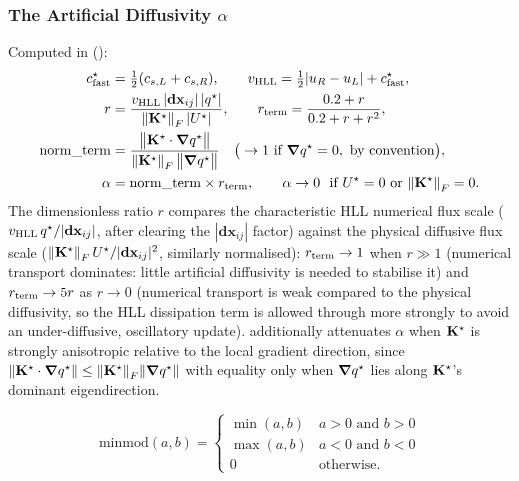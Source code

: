 \subsubsection{The Artificial Diffusivity $\alpha$}
Computed in 
():
\begin{align}
  c_{\rm fast}^\star &= \tfrac12(c_{s,L}+c_{s,R}) , \qquad
  v_{\rm HLL} = \tfrac12|u_R-u_L| + c_{\rm fast}^\star , \\
  r &= \frac{v_{\rm HLL}\, |\mathbf{dx}_{ij}|\, |q^\star|}{\norm{\mathbf{K}^{\star}}_F \, |U^\star|} ,
  \qquad
  r_{\rm term} = \frac{0.2+r}{0.2+r+r^2} , \\
  \mathrm{norm\_term} &=
    \frac{\big\| \mathbf{K}^{\star} \cdot \grad q^\star \big\|}{\norm{\mathbf{K}^{\star}}_F\,\big\|\grad q^\star\big\|}
    \quad\big(\to 1 \text{ if } \grad q^\star = 0,\ \text{by convention}\big), \\
  \alpha &= \mathrm{norm\_term}\times r_{\rm term} ,
  \qquad \alpha \to 0 \ \text{ if } U^\star = 0 \text{ or } \norm{\mathbf{K}^{\star}}_F = 0 .
  \label{eq:alpha_def}
\end{align}
The dimensionless ratio $r$ compares the characteristic HLL numerical
flux scale ($v_{\rm HLL}\,q^\star/|\mathbf{dx}_{ij}|$, after
clearing the $|\mathbf{dx}_{ij}|$ factor) against the physical diffusive
flux scale ($\norm{\mathbf{K}^{\star}}_F\,U^\star/|\mathbf{dx}_{ij}|^2$, similarly
normalised): $r_{\rm term}\to 1$ when $r\gg1$ (numerical transport
dominates: little artificial diffusivity is needed to stabilise it) and
$r_{\rm term}\to 5r$ as $r\to0$ (numerical transport is weak compared to
the physical diffusivity, so the HLL dissipation term is allowed through
more strongly to avoid an under-diffusive, oscillatory update).
 additionally attenuates $\alpha$ when $\mathbf{K}^{\star}$ is
strongly anisotropic relative to the local gradient direction, since
$\|\mathbf{K}^{\star}\cdot\grad q^\star\| \leq \norm{\mathbf{K}^{\star}}_F
\|\grad q^\star\|$ with equality only when $\grad q^\star$ lies
along $\mathbf{K}^{\star}$'s dominant eigendirection.

\begin{definition}
\label{eq:minmod_def}
\begin{equation}
  \mathrm{minmod}(a,b) =
  \begin{cases}
    \min(a,b) & a>0 \text{ and } b>0 \\
    \max(a,b) & a<0 \text{ and } b<0 \\
    0 & \text{otherwise.}
  \end{cases}
\end{equation}
\end{definition}

